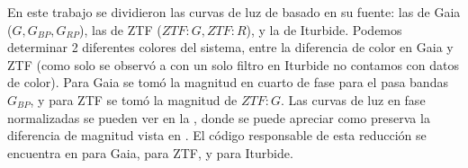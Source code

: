 En este trabajo se dividieron las curvas de luz de \atoObjId basado en su
fuente: las de Gaia ($G, G_{BP}, G_{RP}$), las de ZTF ($ZTF:G, ZTF:R$), y la de
Iturbide. Podemos determinar 2 diferentes colores del sistema, entre la
diferencia de color en Gaia y ZTF (como solo se observó a \atoObjId con un solo
filtro en Iturbide no contamos con datos de color). Para Gaia se tomó la
magnitud en cuarto de fase para el pasa bandas $G_{BP}$, y para ZTF se tomó la
magnitud de $ZTF:G$. Las curvas de luz en fase normalizadas se pueden ver en la
, donde se puede apreciar como preserva la
diferencia de magnitud vista en . El
código responsable de esta reducción se encuentra en
\href{https://github.com/KnightIV/UANL_MAPTA_Observaciones/blob/main/analisis/gaia/light_curves.ipynb}{}
para Gaia,
\href{https://github.com/KnightIV/UANL_MAPTA_Observaciones/blob/main/analisis/ztf/light-curve-processing.ipynb}{}
para ZTF, y
\href{https://github.com/KnightIV/UANL_MAPTA_Observaciones/blob/main/analisis/iturbide/iraf/qphot_timeseries_analysis.ipynb}{}
para Iturbide.

